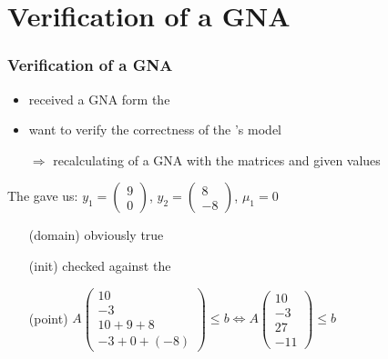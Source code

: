\section{Verification of a GNA}
\frame{\tableofcontents[currentsection]}
\begin{frame}
	\frametitle{\color{white}Verification of a GNA}
	\begin{itemize}
		\item received a GNA form the \solver
		\item want to verify the correctness of the \solver's model
		\item[$\Rightarrow$] recalculating of a GNA with the matrices and given values
	\end{itemize}
	\begin{example}
		The \solver gave us: $y_1=\begin{pmatrix} 9 \\ 0 \end{pmatrix}$, $y_2=\begin{pmatrix} 8 \\ -8 \end{pmatrix}$, $\mu_1=0$\newline
		\begin{itemize}
			\setlength{\itemindent}{1.5cm}
			\item[(domain)] obviously true \checkmark
			\item[(init)] checked against the \stem \checkmark
			\item[(point)]  $A\begin{pmatrix} 10 \\ -3 \\ 10+9+8 \\ -3 + 0 + (-8) \end{pmatrix} \le b \Leftrightarrow A\begin{pmatrix} 10 \\ -3 \\ 27 \\ -11 \end{pmatrix} \le b$ \checkmark
		\end{itemize}
	\end{example}
\end{frame}

